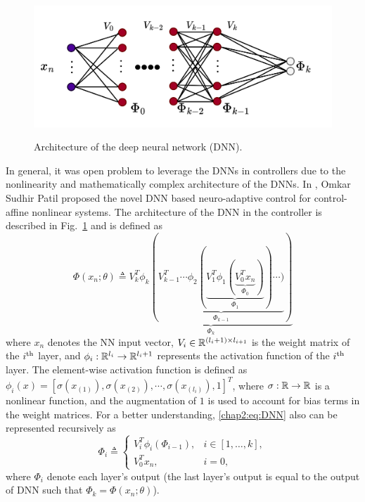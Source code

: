 \begin{figure}[!t]      
  \centering
  {\includegraphics[width=.85\linewidth]{imgs/NN.drawio.png}}
  \caption{Architecture of the deep neural network (DNN).}
  \label{chap2:fig:DNN}
\end{figure}

In general, it was open problem to leverage the DNNs in controllers due to the nonlinearity and mathematically complex architecture of the DNNs.
In \cite{RN13}, Omkar Sudhir Patil \etal proposed the novel DNN based neuro-adaptive control for control-affine nonlinear systems.
The architecture of the DNN in the controller is described in Fig.~\ref{chap2:fig:DNN} and is defined as 
\begin{equation}
  \Phi(x_n;\theta) \triangleq 
  \underbrace{
    V_k^T  \phi_{k}(
    \underbrace{
      V_{k-1}^T   \cdots \phi_2(
      \underbrace
        {
        V_1^T   \phi_1(
        \underbrace
          {
          V_0^T   x_n
        }_{\Phi_0}
        )
      }_{\Phi_1}
      )\cdots )
    }_{\Phi_{k-1}}
    )
  }_{\Phi_k}
  \label{chap2:eq:DNN}
\end{equation}
where $x_n$ denotes the NN input vector, $V_i\in\mathbb{R}^{(l_i+1)\times l_{i+1}}$ is the weight matrix of the $i\textsuperscript{th}$ layer, and $\phi_i: \mathbb{R}^{l_i}\to\mathbb{R}^{l_i+1}$ represents the activation function of the $i\textsuperscript{th}$ layer. 
The element-wise activation function is defined as $\phi_i(x)=[\sigma(x_{(1)}),\sigma(x_{(2)}),\cdots, \sigma(x_{(l_{i})}), 1]^T$, where $\sigma: \mathbb{R}\to\mathbb{R}$ is a nonlinear function, and the augmentation of $1$ is used to account for bias terms in the weight matrices.  
For a better understanding, \eqref{chap2:eq:DNN} also can be represented recursively as 
\begin{equation}
    \Phi_i \triangleq
    \begin{cases}
        V_i^T  \phi_i(\Phi_{i-1}), &i\in[1,\dots,k],\\
        V_0^T  x_n,&i=0,
    \end{cases}
\end{equation}
where $\Phi_i$ denote each layer's output (\ie the last layer's output is equal to the output of DNN such that $\Phi_k = \Phi(x_n;\theta)$).

